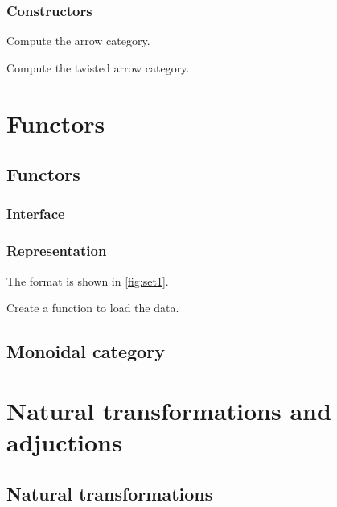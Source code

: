 \subsection*{Constructors}


\begin{exercise}
Compute the arrow category.

\end{exercise}


\begin{exercise}
Compute the twisted arrow category.

\end{exercise}


\chapter{Functors}


\section{Functors}

\subsection*{Interface}

\subsection*{Representation}
The format is shown in \cref{fig:set1}.




\begin{exercise}
Create a function to load the data.
%
\end{exercise}


\section{Monoidal category}


\chapter{Natural transformations and adjuctions}


\section{Natural transformations}

